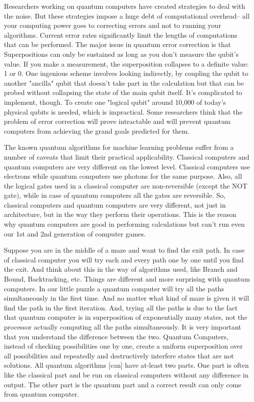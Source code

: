 Researchers working on quantum computers have created strategies to deal with the noise. But these strategies impose a huge debt of computational overhead-- all your computing power goes to correcting errors and not to running your algorithms. Current error rates significantly limit the lengths of computations that can be performed. The major issue in quantum error correction is that Superpositions can only be sustained as long as you don't measure the qubit's value. If you make a measurement, the superposition collapses to a definite value: 1 or 0. One ingenious scheme involves looking indirectly, by coupling the qubit to another "ancilla" qubit that doesn't take part in the calculation but that can be probed without collapsing the state of the main qubit itself. It's complicated to implement, though. To create one "logical qubit" around 10,000 of today's physical qubits is needed, which is impractical. Some researchers think that the problem of error correction will prove intractable and will prevent quantum computers from achieving the grand goals predicted for them.\par\bigskip
The known quantum algorithms for machine learning problems suffer from a number of caveats that limit their practical applicability. Classical computers and quantum computers are very different on the lowest level. Classical computers use electrons while quantum computers use photons for the same purpose. Also, all the logical gates used in a classical computer are non-reversible (except the NOT gate), while in case of quantum computers all the gates are reversible. So, classical computers and quantum computers are very different, not just in architecture, but in the way they perform their operations. This is the reason why quantum computers are good in performing calculations but can't run even our 1st and 2nd generation of computer games. \par\bigskip
Suppose you are in the middle of a maze and want to find the exit path. In case of classical computer you will try each and every path one by one until you find the exit. And think about this in the way of algorithms used, like Branch and Bound, Backtracking, etc. Things are different and more surprising with quantum computers. In our little puzzle a quantum computer will try all the paths simultaneously in the first time. And no matter what kind of maze is given it will find the path in the first iteration. And, trying all the paths is due to the fact that quantum computer is in superposition of exponentially many states, not the processor actually computing all the paths simultaneously. It is very important that you understand the difference between the two. Quantum Computers, instead of checking possibilities one by one, create a uniform superposition over all possibilities and repeatedly and destructively interfere states that are not solutions. All quantum algorithms [can] have at-least two parts. One part is often like the classical part and be run on classical computers without any difference in output. The other part is the quantum part and a correct result can only come from quantum computer. 
